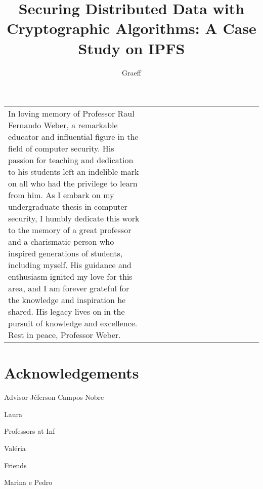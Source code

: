\documentclass[cic,tc,english]{iiufrgs}
\title{
    Securing Distributed Data with Cryptographic Algorithms: A Case Study on 
    IPFS
}
\author{Graeff}{Felipe de Almeida}
\begin{document}
\maketitle

\clearpage
\begin{flushright}
    \mbox{}\vfill
    \begin{tabular}{p{0.55\linewidth} p{0.45\linewidth}}
        In loving memory of Professor Raul Fernando Weber, a remarkable educator
        and influential figure in the field of computer security. His passion
        for teaching and dedication to his students left an indelible mark on
        all who had the privilege to learn from him. As I embark on my
        undergraduate thesis in computer security, I humbly dedicate this work
        to the memory of a great professor and a charismatic person who inspired
        generations of students, including myself. His guidance and enthusiasm
        ignited my love for this area, and I am forever grateful for the
        knowledge and inspiration he shared. His legacy lives on in the pursuit
        of knowledge and excellence. Rest in peace, Professor Weber.\\
    \end{tabular}
\end{flushright}

\chapter*{Acknowledgements}
    Advisor Jéferson Campos Nobre

    Laura

    Professors at Inf

    Valéria

    Friends

    Marina e Pedro

\end{document}
